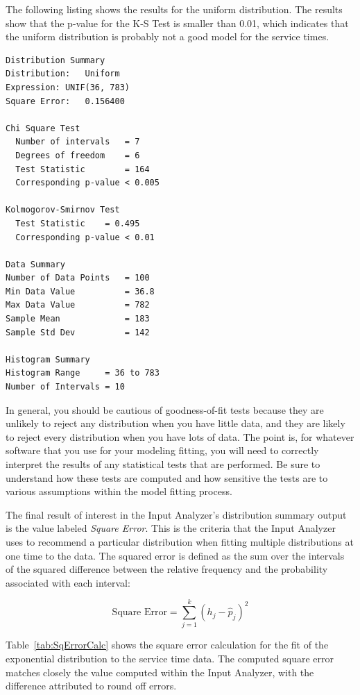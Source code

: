 \documentclass[
]{book}
\theoremstyle{definition}
\theoremstyle{definition}
\theoremstyle{definition}
\theoremstyle{definition}
\theoremstyle{remark}
\begin{document}
The following listing shows the results for the uniform distribution. The results show that the p-value for the K-S Test is smaller than 0.01, which indicates that the uniform distribution is probably not a good model for
the service times.

\begin{verbatim}
Distribution Summary
Distribution:   Uniform      
Expression: UNIF(36, 783)
Square Error:   0.156400

Chi Square Test
  Number of intervals   = 7
  Degrees of freedom    = 6
  Test Statistic        = 164
  Corresponding p-value < 0.005

Kolmogorov-Smirnov Test
  Test Statistic    = 0.495
  Corresponding p-value < 0.01

Data Summary
Number of Data Points   = 100
Min Data Value          = 36.8
Max Data Value          = 782
Sample Mean             = 183
Sample Std Dev          = 142

Histogram Summary
Histogram Range     = 36 to 783
Number of Intervals = 10
\end{verbatim}

In general, you should be cautious of goodness-of-fit tests because they
are unlikely to reject any distribution when you have little data, and
they are likely to reject every distribution when you have lots of data.
The point is, for whatever software that you use for your modeling
fitting, you will need to correctly interpret the results of any
statistical tests that are performed. Be sure to understand how these
tests are computed and how sensitive the tests are to various
assumptions within the model fitting process.

The final result of interest in the Input Analyzer's distribution
summary output is the value labeled \emph{Square Error}. This is the criteria
that the Input Analyzer uses to recommend a particular distribution when
fitting multiple distributions at one time to the data. The squared error is defined as the sum over the intervals of the squared difference between the relative frequency and the probability
associated with each interval:

\begin{equation}
\text{Square Error} = \sum_{j = 1}^k (h_j - \hat{p}_j)^2
\label{eq:SquaredError}
\end{equation}

Table~\ref{tab:SqErrorCalc} shows the square error calculation for the fit of the exponential
distribution to the service time data. The computed square error matches
closely the value computed within the Input Analyzer, with the
difference attributed to round off errors.
\end{document}
